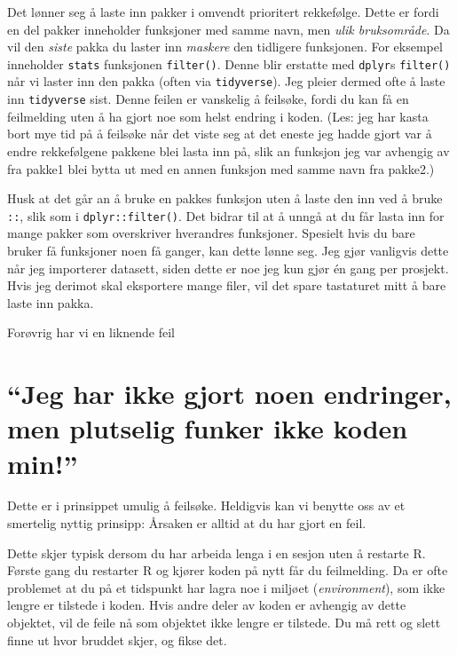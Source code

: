 \documentclass[
  letterpaper,
  DIV=11,
  numbers=noendperiod]{scrreprt}
\begin{document}
Det lønner seg å laste inn pakker i omvendt prioritert rekkefølge. Dette
er fordi en del pakker inneholder funksjoner med samme navn, men
\emph{ulik bruksområde}. Da vil den \emph{siste} pakka du laster inn
\emph{maskere} den tidligere funksjonen. For eksempel inneholder
\texttt{stats} funksjonen \texttt{filter()}. Denne blir erstatte med
\texttt{dplyr}s \texttt{filter()} når vi laster inn den pakka (often via
\texttt{tidyverse}). Jeg pleier dermed ofte å laste inn
\texttt{tidyverse} sist. Denne feilen er vanskelig å feilsøke, fordi du
kan få en feilmelding uten å ha gjort noe som helst endring i koden.
(Les: jeg har kasta bort mye tid på å feilsøke når det viste seg at det
eneste jeg hadde gjort var å endre rekkefølgene pakkene blei lasta inn
på, slik an funksjon jeg var avhengig av fra pakke1 blei bytta ut med en
annen funksjon med samme navn fra pakke2.)

Husk at det går an å bruke en pakkes funksjon uten å laste den inn ved å
bruke \texttt{::}, slik som i \texttt{dplyr::filter()}. Det bidrar til
at å unngå at du får lasta inn for mange pakker som overskriver
hverandres funksjoner. Spesielt hvis du bare bruker få funksjoner noen
få ganger, kan dette lønne seg. Jeg gjør vanligvis dette når jeg
importerer datasett, siden dette er noe jeg kun gjør én gang per
prosjekt. Hvis jeg derimot skal eksportere mange filer, vil det spare
tastaturet mitt å bare laste inn pakka.

Forøvrig har vi en liknende feil

\hypertarget{jeg-har-ikke-gjort-noen-endringer-men-plutselig-funker-ikke-koden-min}{%
\section{``Jeg har ikke gjort noen endringer, men plutselig funker ikke
koden
min!''}\label{jeg-har-ikke-gjort-noen-endringer-men-plutselig-funker-ikke-koden-min}}

Dette er i prinsippet umulig å feilsøke. Heldigvis kan vi benytte oss av
et smertelig nyttig prinsipp: Årsaken er alltid at du har gjort en feil.

Dette skjer typisk dersom du har arbeida lenga i en sesjon uten å
restarte R. Første gang du restarter R og kjører koden på nytt får du
feilmelding. Da er ofte problemet at du på et tidspunkt har lagra noe i
miljøet (\emph{environment}), som ikke lengre er tilstede i koden. Hvis
andre deler av koden er avhengig av dette objektet, vil de feile nå som
objektet ikke lengre er tilstede. Du må rett og slett finne ut hvor
bruddet skjer, og fikse det.
\end{document}
